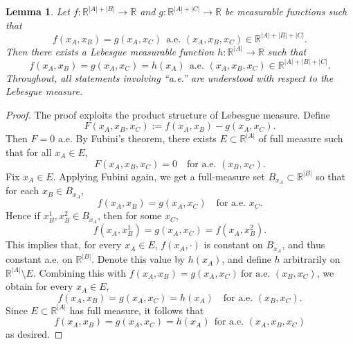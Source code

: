 \documentclass[sn-mathphys-num]{sn-jnl}%
\numberwithin{equation}{section}
\newcommand{\redblock}[1]{{\color{black}#1}}
\newcommand{\R}{\mathbb{R}}
\newtheorem{lemma}{Lemma}
\theoremstyle{thmstyleone}%
\theoremstyle{thmstyletwo}%
\theoremstyle{thmstylethree}%
\begin{document}
\redblock{
\begin{lemma}
\label{lemma:measure-theoretic-lemma}
Let $f: \R^{|A|+|B|} \to \R$ and $g: \R^{|A|+|C|} \to \R$ be measurable functions such that 
\begin{equation*}
	f(x_A, x_B) = g(x_A, x_C)~~\text{a.e. $(x_A,x_B,x_C)\in \R^{|A|+|B|+|C|}$}.
\end{equation*}
Then there exists a Lebesgue measurable function $h: \R^{|A|} \to \R$ such that 
\begin{equation*}
	f(x_A, x_B) = g(x_A, x_C) = h(x_A)~~\text{a.e. $(x_A,x_B,x_C)\in \R^{|A|+|B|+|C|}$}.
\end{equation*}
Throughout, all statements involving “a.e.” are understood with respect to the Lebesgue measure.
\end{lemma}
\begin{proof}
The proof exploits the product structure of Lebesgue measure. Define
\[
F(x_A,x_B,x_C):=f(x_A,x_B)-g(x_A,x_C).
\]
Then $F=0$ a.e. By Fubini's theorem, there exists 
$E\subset \R^{|A|}$ of full measure such that for all $x_A\in E$,
\[
F(x_A,x_B,x_C)=0
\quad \text{for a.e. }(x_B,x_C).
\]
Fix $x_A\in E$. Applying Fubini again, we get a full-measure set 
$B_{x_A}\subset \R^{|B|}$ so that for each $x_B\in B_{x_A}$,
\[
f(x_A,x_B)=g(x_A,x_C)
\quad \text{for a.e. }x_C.
\]
Hence if $x_B^1,x_B^2\in B_{x_A}$, then for some $x_C$,
\[
f(x_A,x_B^1)=g(x_A,x_C)=f(x_A,x_B^2).
\]
This implies that, for every $x_A \in E$, $f(x_A,\cdot)$ is constant on $B_{x_A}$, and thus constant a.e. on \(\R^{|B|}\). 
Denote this value by $h(x_A)$, and define $h$ arbitrarily on $\R^{|A|}\setminus E$.
Combining this with $f(x_A,x_B)=g(x_A,x_C)~\text{for a.e. }(x_B,x_C)$, 
we obtain for every $x_A \in E$,
\[
f(x_A,x_B)=g(x_A,x_C)=h(x_A)
\quad \text{for a.e. }(x_B,x_C).
\]
Since $E \subset \R^{|A|}$ has full measure, it follows that
\begin{equation*}
	f(x_A, x_B) = g(x_A, x_C) = h(x_A)~~\text{for a.e. $(x_A,x_B,x_C)$}
\end{equation*}
as desired. 
\end{proof}
}
\end{document}
